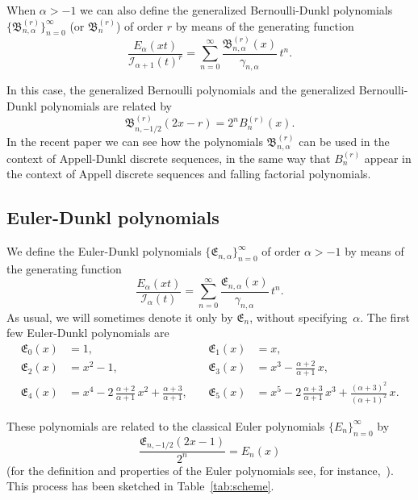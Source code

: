 \documentclass[a4paper]{amsart}
\newcommand{\I}{\mathcal{I}}
\newcommand{\Ea}{E_{\alpha}}
\newcommand{\cc}{\gamma}
\newcommand{\B}{\mathfrak{B}}
\newcommand{\E}{\mathfrak{E}}
\theoremstyle{plain}
\theoremstyle{definition}
\theoremstyle{remark}
\numberwithin{equation}{section}
\begin{document}
When $\alpha>-1$ we can also define the generalized Bernoulli-Dunkl polynomials $\{\B_{n,\alpha}^{(r)}\}_{n=0}^{\infty}$ (or $\B_n^{(r)}$) of order $r$ by means of the generating function
\begin{equation}
\label{eq:defbdr}
  \frac{\Ea(xt)}{\I_{\alpha+1}(t)^r}
  = \sum_{n=0}^\infty \frac{\B_{n,\alpha}^{(r)}(x)}{\cc_{n,\alpha}}\,t^n.
\end{equation}

In this case, the generalized Bernoulli polynomials and the generalized Bernoulli-Dunkl polynomials are related by
\[
  \B_{n,-1/2}^{(r)}(2x-r) = 2^n B_n^{(r)}(x).
\]
In the recent paper \cite{ExLaMiVa} we can see how the polynomials $\B_{n,\alpha}^{(r)}$ can be used in the context of Appell-Dunkl discrete sequences, in the same way that $B_n^{(r)}$ appear in the context of Appell discrete sequences and falling factorial polynomials.


\subsection{Euler-Dunkl polynomials}

We define the Euler-Dunkl polynomials $\{\E_{n,\alpha}\}_{n=0}^{\infty}$ of order $\alpha>-1$ by means of the generating function
\begin{equation*}
  \frac{\Ea(xt)}{\I_{\alpha}(t)}
  = \sum_{n=0}^\infty \frac{\E_{n,\alpha}(x)}{\cc_{n,\alpha}} \,t^n.
\end{equation*}
As usual, we will sometimes denote it only by $\E_{n}$, without specifying~$\alpha$.
The first few Euler-Dunkl polynomials are
\begin{align*}
  \E_0(x) &= 1, \quad & \E_1(x) &= x, \\
  \E_2(x) &= x^2-1, \quad &
  \E_3(x) &= x^3 - \frac{\alpha+2}{\alpha+1}\,x, \\
  \E_4(x) &= x^4 - 2\,\frac{\alpha+2}{\alpha+1}\,x^2 + \frac{\alpha+3}{\alpha+1},\quad &
  \E_5(x) &= x^5 - 2\,\frac{\alpha+3}{\alpha+1}\,x^3 + \frac{(\alpha+3)^2}{(\alpha+1)^2}\,x.
\end{align*}

These polynomials are related to the classical Euler polynomials $\{E_n\}_{n=0}^{\infty}$ by
\begin{equation}
\label{eq:EtoE}
  \frac{\E_{n,-1/2}(2x-1)}{2^n} = E_n(x)
\end{equation}
(for the definition and properties of the Euler polynomials see, for instance,~\cite{Dil-NIST}).
This process has been sketched in Table~\ref{tab:scheme}.
\end{document}
